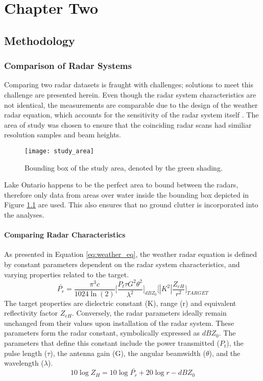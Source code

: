 \chapter{Chapter Two}
\section{Methodology}
\subsection{Comparison of Radar Systems}
Comparing two radar datasets is fraught with challenges; solutions to meet this challenge are presented herein. Even though the radar system characteristics are not identical, the measurements are comparable due to the design of the weather radar equation, which accounts for the sensitivity of the radar system itself \citep{Rogers1989}. The area of study was chosen to ensure that the coinciding radar scans had similiar resolution samples and beam heights. 
\begin{figure}[h]
\texttt{[image: study\_area]}\centering
\caption{Bounding box of the study area, denoted by the green shading.} 
\label{fig:study_area}
\end{figure}
Lake Ontario happens to be the perfect area to bound between the radars, therefore only data from areas over water inside the bounding box depicted in Figure \ref{fig:study_area} are used. This also ensures that no ground clutter is incorporated into the analyses.
\subsubsection{Comparing Radar Characteristics}

As presented in Equation \ref{eq:weather_eq}, the weather radar equation is defined by constant parameters dependent on the radar system characteristics, and varying properties related to the target. 
\begin{equation}\label{eq:weather_eq}
\bar{P_r} = \frac{\pi^3c}{1024 \ln(2)} \Bigg[\frac{P_t \tau G^2 \theta^2}{\lambda^2}\Bigg]_{dBZ_0} \Bigg[|K^2|\frac{Z_{eH}}{r^2}\Bigg]_{TARGET}
\end{equation}
The target properties are dielectric constant (K), range (r) and equivalent reflectivity factor $Z_{eH}$. Conversely, the radar parameters ideally remain unchanged from their values upon installation of the radar system. These parameters form the radar constant, symbolically expressed as $dBZ_0$. The parameters that define this constant include the power transmitted ($P_t$), the pulse length ($\tau$), the antenna gain (G), the angular beamwidth ($\theta$), and the wavelength ($\lambda$).
\begin{equation}\label{eq:radpow}
10 \log Z_{H} = 10 \log{\bar{P_r}} + 20 \log r - dBZ_0
\end{equation}

